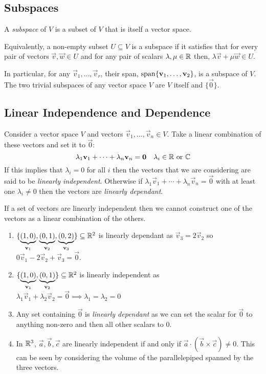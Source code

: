 \documentclass[../main.tex]{subfiles}
\begin{document}
\subsection{Subspaces}
\begin{definition}[Subspace]
  A \textit{subspace} of $V$ is a subset of $V$ that is itself a vector space.

  Equivalently, a non-empty subset $U \subseteq V$ is a subspace if it satisfies that for every pair of vectors $\vec{v}, \vec{w} \in U$ and for any pair of scalars $\lambda, \mu \in \mathbb{R}$ then, $\lambda \vec{v} + \mu \vec{w} \in U$.
\end{definition}
In particular, for any $\vec{v}_1, \ldots, \vec{v}_r$, their span, $\operatorname{span}\{\boldsymbol{\mathbf{v}}_1, \ldots, \boldsymbol{\mathbf{v}}_2\}$, is a subspace of $V$.
The two trivial subspaces of any vector space $V$ are $V$ itself and $\{\vec{0}\}$.

\subsection{Linear Independence and Dependence}
\begin{definition}
  Consider a vector space $V$ and vectors $\vec{v}_1, \ldots, \vec{v}_n \in V$.
  Take a linear combination of these vectors and set it to $\vec{0}$:
  \[
    \lambda_1 \boldsymbol{\mathbf{v}}_1 + \cdots + \lambda_n \boldsymbol{\mathbf{v}}_n = \boldsymbol{\mathbf{0}} \quad \lambda_i \in \mathbb{R} \text{ or } \mathbb{C}
  \]
  If this implies that $\lambda_i = 0$ for all $i$ then the vectors that we are considering are said to be \textit{linearly independent}.
  Otherwise if $\lambda_1 \vec{v}_1 + \cdots + \lambda_n \vec{v}_n = \vec{0}$ with at least one $\lambda_i \neq 0$ then the vectors are \textit{linearly dependant}.
\end{definition}

If a set of vectors are linearly independent then we cannot construct one of the vectors as a linear combination of the others.
\begin{example}
  \begin{enumerate}
    \item $\{\underbrace{(1, 0)}_{\boldsymbol{\mathbf{v}}_1}, \underbrace{(0, 1)}_{\boldsymbol{\mathbf{v}}_2}, \underbrace{(0, 2)}_{\boldsymbol{\mathbf{v}}_3}\} \subseteq \mathbb{R}^2$ is linearly dependant as $\vec{v}_3 = 2\vec{v}_2$ so $0\vec{v}_1 - 2\vec{v}_2 + \vec{v}_3 = \vec{0}$.
    \item $\{\underbrace{(1, 0)}_{\boldsymbol{\mathbf{v}}_1}, \underbrace{(0, 1)}_{\boldsymbol{\mathbf{v}}_2}\} \subseteq \mathbb{R}^2$ is linearly independent as $\lambda_1 \vec{v}_1 + \lambda_2 \vec{v}_2 = \vec{0} \implies \lambda_1 = \lambda_2 = 0$
    \item Any set containing $\vec{0}$ is \textit{linearly dependant} as we can set the scalar for $\vec{0}$ to anything non-zero and then all other scalars to 0.
    \item In $\mathbb{R}^3$, $\vec{a}, \vec{b}, \vec{c}$ are linearly independent if and only if $\vec{a} \cdot (\vec{b} \times \vec{c}) \neq 0$.
      This can be seen by considering the volume of the parallelepiped spanned by the three vectors.
 \end{enumerate}
\end{example}
\end{document}
